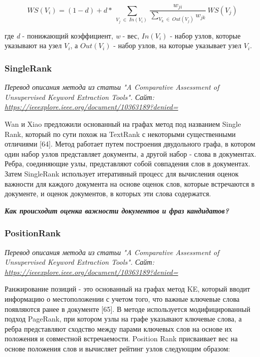\documentclass[bachelor, och, diploma ]{SCWorks}
\begin{document}
\begin{equation*} WS\left ({V_{i}}\right) \!= \! \left ({1\!-\!d}\right) \!+\! d\ast ~\sum _{V_{j}~\in ~In\left ({V_{i}}\right)~}{\frac {w_{ji}}{\sum _{V_{k}~\in ~Out\left ({V_{j}}\right)} w_{jk}}~WS(V_{j})} \tag{10}\end{equation*}

где \textit{d} - понижающий коэффициент, \textit{w} - вес, $In(V_i)$ - набор узлов, которые указывают на узел $V_i$, а $Out(V_i)$ - набор узлов, на которые указывает узел $V_i$.


\subsubsection{SingleRank}
\textit{Перевод описания метода из статьи "A Comparative Assessment of Unsupervised Keyword Extraction Tools". Сайт: \url{https://ieeexplore.ieee.org/document/10363189?denied=}}

Wan и Xiao предложили основанный на графах метод под названием Single Rank, который по сути похож на TextRank с некоторыми существенными отличиями [64]. Метод работает путем построения двудольного графа, в котором один набор узлов представляет документы, а другой набор - слова в документах. Ребра, соединяющие узлы, представляют собой совпадения слов в документах. Затем SingleRank использует итеративный процесс для вычисления оценок важности для каждого документа на основе оценок слов, которые встречаются в документе, и оценок документов, в которых эти слова содержатся.

\textit{\textbf{Как происходит оценка важности документов и фраз кандидатов?}}


\subsubsection{PositionRank}
\textit{Перевод описания метода из статьи "A Comparative Assessment of Unsupervised Keyword Extraction Tools". Сайт: \url{https://ieeexplore.ieee.org/document/10363189?denied=}}

Ранжирование позиций - это основанный на графах метод KE, который вводит информацию о местоположении с учетом того, что важные ключевые слова появляются ранее в документе [65]. В методе используется модифицированный подход PageRank, при котором узлы на графе указывают ключевые слова, а ребра представляют сходство между парами ключевых слов на основе их положения и совместной встречаемости. Position Rank присваивает вес на основе положения слов и вычисляет рейтинг узлов следующим образом:
\end{document}
